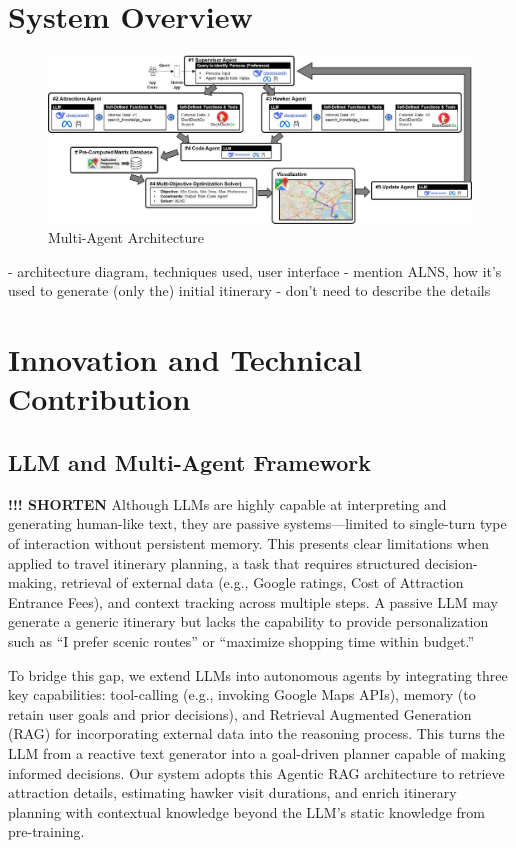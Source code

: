 \documentclass{ecai}
\begin{document}
\section{System Overview}
\begin{figure}[h]
    \centering
    \includegraphics[width=1\textwidth]{6098288248590812104.jpg}
    \caption{Multi-Agent Architecture}
    \label{fig:Workflow Diagram}
\end{figure}
- architecture diagram, techniques used, user interface
- mention ALNS, how it's used to generate (only the) initial itinerary
    - don't need to describe the details

\section{Innovation and Technical Contribution}
\subsection{LLM and Multi-Agent Framework}
\textbf{!!! SHORTEN} Although LLMs are highly capable at interpreting and generating human-like text, they are passive systems—limited to single-turn type of interaction without persistent memory. This presents clear limitations when applied to travel itinerary planning, a task that requires structured decision-making, retrieval of external data (e.g., Google ratings, Cost of Attraction Entrance Fees), and context tracking across multiple steps. A passive LLM may generate a generic itinerary but lacks the capability to provide personalization such as “I prefer scenic routes” or “maximize shopping time within budget.”

To bridge this gap, we extend LLMs into autonomous agents by integrating three key capabilities: tool-calling (e.g., invoking Google Maps APIs), memory (to retain user goals and prior decisions), and Retrieval Augmented Generation (RAG) for incorporating external data into the reasoning process. This turns the LLM from a reactive text generator into a goal-driven planner capable of making informed decisions. Our system adopts this Agentic RAG architecture to retrieve attraction details, estimating hawker visit durations, and enrich itinerary planning with contextual knowledge beyond the LLM’s static knowledge from pre-training.
\end{document}

